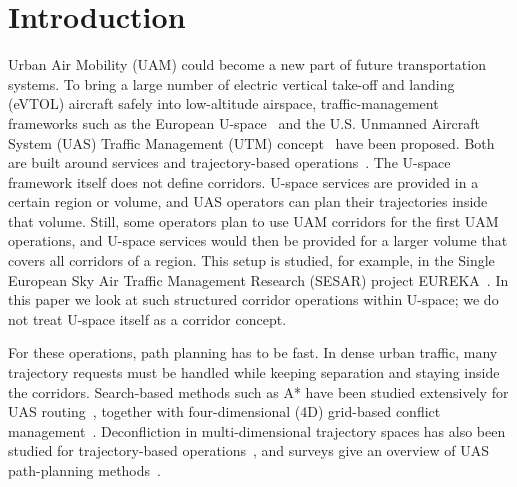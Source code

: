 \section{Introduction}
\label{sec:introduction}

Urban Air Mobility (UAM) could become a new part of future transportation systems. To bring a large number of electric vertical take-off and landing (eVTOL) aircraft safely into low-altitude airspace, traffic-management frameworks such as the European U-space~\cite{eu_commission_2017,easa2020uspace} and the U.S. Unmanned Aircraft System (UAS) Traffic Management (UTM) concept~\cite{kopardekar2016utm} have been proposed. Both are built around services and trajectory-based operations~\cite{sesar_conops_2019,sesar_master_plan_2025}. The U-space framework itself does not define corridors. U-space services are provided in a certain region or volume, and UAS operators can plan their trajectories inside that volume. Still, some operators plan to use UAM corridors for the first UAM operations, and U-space services would then be provided for a larger volume that covers all corridors of a region. This setup is studied, for example, in the Single European Sky Air Traffic Management Research (SESAR) project EUREKA~\cite{sesar_eureka_project}. In this paper we look at such structured corridor operations within U-space; we do not treat U-space itself as a corridor concept.

For these operations, path planning has to be fast. In dense urban traffic, many trajectory requests must be handled while keeping separation and staying inside the corridors. Search-based methods such as A* have been studied extensively for UAS routing~\cite{sahawneh2016_3d_path_planning,a_star_2d3d_comparison_utm}, together with four-dimensional (4D) grid-based conflict management~\cite{acevedo_4d_grids_u_space}. Deconfliction in multi-dimensional trajectory spaces has also been studied for trajectory-based operations~\cite{NDMap,enea_porretta_4d_tbo_comparison}, and surveys give an overview of UAS path-planning methods~\cite{ahmad2023_uav_path_planning_survey}.

